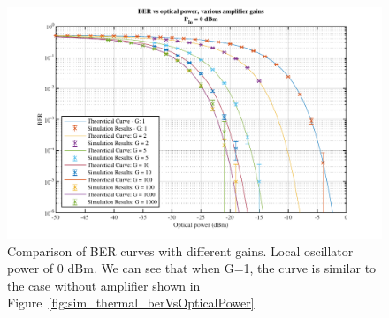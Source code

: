 	\begin{figure}[H]
	\centering
	\includegraphics[width=1\textwidth]
	{sdf/m_qam_system/figures/simulations/03_eNoise/berVsOpticalPowerVar.pdf}
	\caption{Comparison of BER curves with different gains. Local oscillator 
	power of 0 dBm. We can see that when G=1, the curve is similar to the case 
	without amplifier shown in 
	Figure~\ref{fig:sim_thermal_berVsOpticalPower}}\label{fig:eNoise_varAmp_berCurveAmpGainVar}
\end{figure}

